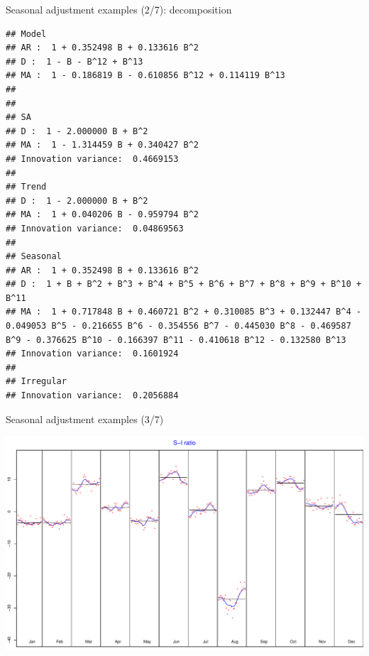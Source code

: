 \documentclass[10pt,xcolor=table,color={dvipsnames,usenames},ignorenonframetext,usepdftitle=false,french]{beamer}
\newenvironment{Shaded}{\begin{snugshade}}{\end{snugshade}}
\newcommand{\KeywordTok}[1]{\textcolor[rgb]{0.13,0.29,0.53}{\textbf{#1}}}
\newcommand{\NormalTok}[1]{#1}
\newcommand{\OperatorTok}[1]{\textcolor[rgb]{0.81,0.36,0.00}{\textbf{#1}}}
\begin{document}
\begin{frame}[fragile]{Seasonal adjustment examples (2/7):
decomposition}
\protect\hypertarget{seasonal-adjustment-examples-27-decomposition}{}

\footnotesize

\begin{Shaded}
\end{Shaded}

\begin{verbatim}
## Model
## AR :  1 + 0.352498 B + 0.133616 B^2 
## D :  1 - B - B^12 + B^13 
## MA :  1 - 0.186819 B - 0.610856 B^12 + 0.114119 B^13 
## 
## 
## SA
## D :  1 - 2.000000 B + B^2 
## MA :  1 - 1.314459 B + 0.340427 B^2 
## Innovation variance:  0.4669153 
## 
## Trend
## D :  1 - 2.000000 B + B^2 
## MA :  1 + 0.040206 B - 0.959794 B^2 
## Innovation variance:  0.04869563 
## 
## Seasonal
## AR :  1 + 0.352498 B + 0.133616 B^2 
## D :  1 + B + B^2 + B^3 + B^4 + B^5 + B^6 + B^7 + B^8 + B^9 + B^10 + B^11 
## MA :  1 + 0.717848 B + 0.460721 B^2 + 0.310085 B^3 + 0.132447 B^4 - 0.049053 B^5 - 0.216655 B^6 - 0.354556 B^7 - 0.445030 B^8 - 0.469587 B^9 - 0.376625 B^10 - 0.166397 B^11 - 0.410618 B^12 - 0.132580 B^13 
## Innovation variance:  0.1601924 
## 
## Irregular
## Innovation variance:  0.2056884
\end{verbatim}

\end{frame}

\begin{frame}[fragile]{Seasonal adjustment examples (3/7)}
\protect\hypertarget{seasonal-adjustment-examples-37}{}

\begin{Shaded}
\end{Shaded}

\includegraphics{img/markdown-unnamed-chunk-8-1.pdf}

\end{frame}
\end{document}
